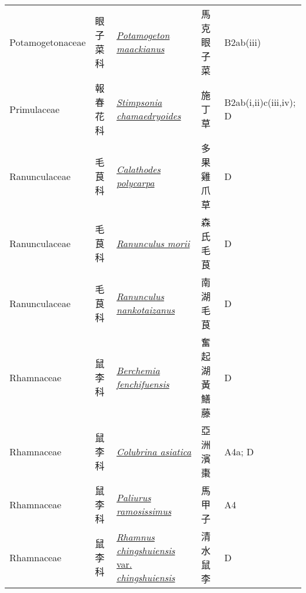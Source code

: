{\begin{longtable}{L{2.5cm}L{2cm}L{5cm}L{2.5cm}L{3cm}}
    Potamogetonaceae & 眼子菜科 & \href{http://www.theplantlist.org/tpl1.1/search?q=Potamogeton+maackianus}{\textit{Potamogeton maackianus} } & 馬克眼子菜 & B2ab(iii)    \\
    Primulaceae & 報春花科 & \href{http://www.theplantlist.org/tpl1.1/search?q=Stimpsonia+chamaedryoides}{\textit{Stimpsonia chamaedryoides} } & 施丁草 & B2ab(i,ii)c(iii,iv); D    \\
    Ranunculaceae & 毛茛科 & \href{http://www.theplantlist.org/tpl1.1/search?q=Calathodes+polycarpa}{\textit{Calathodes polycarpa} } & 多果雞爪草 & D    \\
    Ranunculaceae & 毛茛科 & \href{http://www.theplantlist.org/tpl1.1/search?q=Ranunculus+morii}{\textit{Ranunculus morii} } & 森氏毛茛 & D    \\
    Ranunculaceae & 毛茛科 & \href{http://www.theplantlist.org/tpl1.1/search?q=Ranunculus+nankotaizanus}{\textit{Ranunculus nankotaizanus} } & 南湖毛茛 & D    \\
    Rhamnaceae & 鼠李科 & \href{http://www.theplantlist.org/tpl1.1/search?q=Berchemia+fenchifuensis}{\textit{Berchemia fenchifuensis} } & 奮起湖黃鱔藤 & D    \\
    Rhamnaceae & 鼠李科 & \href{http://www.theplantlist.org/tpl1.1/search?q=Colubrina+asiatica}{\textit{Colubrina asiatica} } & 亞洲濱棗 & A4a; D    \\
    Rhamnaceae & 鼠李科 & \href{http://www.theplantlist.org/tpl1.1/search?q=Paliurus+ramosissimus}{\textit{Paliurus ramosissimus} } & 馬甲子 & A4    \\
    Rhamnaceae & 鼠李科 & \href{http://www.theplantlist.org/tpl1.1/search?q=Rhamnus+chingshuiensis+var.+chingshuiensis}{\textit{Rhamnus chingshuiensis} var. \textit{chingshuiensis} } & 清水鼠李 & D    \\

\end{longtable}}
